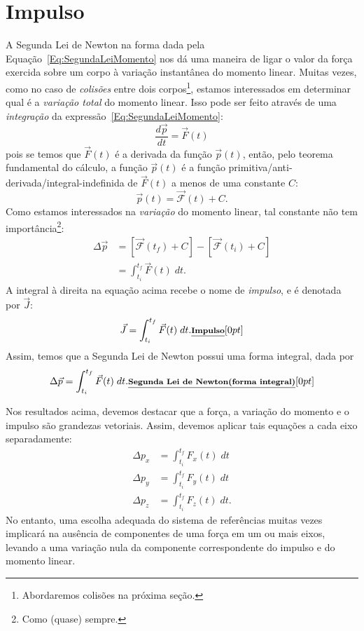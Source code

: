\section{Impulso}

A Segunda Lei de Newton na forma dada pela Equação~\eqref{Eq:SegundaLeiMomento} nos dá uma maneira de ligar o valor da força exercida sobre um corpo à variação instantânea do momento linear. Muitas vezes, como no caso de \emph{colisões} entre dois corpos\footnote{Abordaremos colisões na próxima seção.}, estamos interessados em determinar qual é a \emph{variação total} do momento linear. Isso pode ser feito através de uma \emph{integração} da expressão~\eqref{Eq:SegundaLeiMomento}:
\begin{equation*}
    \frac{d\vec{p}}{dt} = \vec{F}(t)
\end{equation*}
%
pois se temos que $\vec{F}(t)$ é a derivada da função $\vec{p}(t)$, então, pelo teorema fundamental do cálculo, a função $\vec{p}(t)$ é a função primitiva/anti-derivada/integral-indefinida de $\vec{F}(t)$ a menos de uma constante $C$:
\begin{equation}
    \vec{p}(t) = \vec{\mathcal{F}}(t) + C.
\end{equation}
%
Como estamos interessados na \emph{variação} do momento linear, tal constante não tem importância\footnote{Como (quase) sempre.}:
\begin{align}
    \Delta \vec{p} &= [\vec{\mathcal{F}}(t_f) + C] - [\vec{\mathcal{F}}(t_i) + C] \\
    &= \int_{t_i}^{t_f} \vec{F}(t) \; dt.\label{Eq:SegundaLeiIntegrando}
\end{align} 
%
A integral à direita na equação acima recebe o nome de \emph{impulso}, e é denotada por $\vec{J}$:
\begin{equation}
    \vec{J} = \int_{t_i}^{t_f} \vec{F}(t) \; dt. \relax{\footnotesize\emph{\textbf{Impulso}}}[0pt]
\end{equation}
%
Assim, temos que a Segunda Lei de Newton possui uma forma integral, dada por
\begin{equation}\label{Eq:Impulso}
    \Delta \vec{p} = \int_{t_i}^{t_f} \vec{F}(t) \; dt. \relax{\footnotesize\emph{\textbf{Segunda Lei de Newton \\ (forma integral)}}}[0pt]
\end{equation}

Nos resultados acima, devemos destacar que a força, a variação do momento e o impulso são grandezas vetoriais. Assim, devemos aplicar tais equações a cada eixo separadamente:
\begin{align}
    \Delta p_x &= \int_{t_i}^{t_f} F_x(t) \; dt \\
    \Delta p_y &= \int_{t_i}^{t_f} F_y(t) \; dt \\
    \Delta p_z &= \int_{t_i}^{t_f} F_z(t) \; dt.
\end{align}
%
No entanto, uma escolha adequada do sistema de referências muitas vezes implicará na ausência de componentes de uma força em um ou mais eixos, levando a uma variação nula da componente correspondente do impulso e do momento linear.

